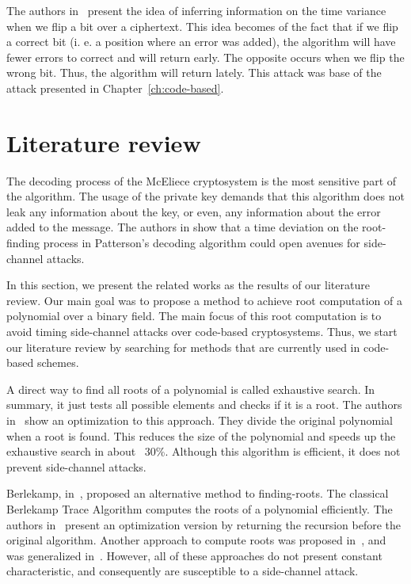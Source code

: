 The authors in~\cite{shoufan2009timing} present the idea of inferring information on the time variance when we flip a bit over a ciphertext. This idea becomes of the fact that if we flip a correct bit (i. e. a position where an error was added), the algorithm will have fewer errors to correct and will return early. The opposite occurs when we flip the wrong bit. Thus, the algorithm will return lately. This attack was base of the attack presented in Chapter~\ref{ch:code-based}.


\section{Literature review}
The decoding process of the McEliece cryptosystem is the most sensitive part of the algorithm. The usage of the private key demands that this algorithm does not leak any information about the key, or even, any information about the error added to the message. The authors in \cite{bucerzan2017improved} show that a time deviation on the root-finding process in Patterson's decoding algorithm could open avenues for side-channel attacks. 

In this section, we present the related works as the results of our literature review. Our main goal was to propose a method to achieve root computation of a polynomial over a binary field. The main focus of this root computation is to avoid timing side-channel attacks over code-based cryptosystems. Thus, we start our literature review by searching for methods that are currently used in code-based schemes.

A direct way to find all roots of a polynomial is called exhaustive search. In summary, it just tests all possible elements and checks if it is a root. The authors in~\cite{strenzke2012fast} show an optimization to this approach. They divide the original polynomial when a root is found. This reduces the size of the polynomial and speeds up the exhaustive search in about ~30\%. Although this algorithm is efficient, it does not prevent side-channel attacks.

Berlekamp, in~\cite{berlekamp1970factoring}, proposed an alternative method to finding-roots. The classical Berlekamp Trace Algorithm computes the roots of a polynomial efficiently. The authors in~\cite{strenzke2012fast} present an optimization version by returning the recursion before the original algorithm. Another approach to compute roots was proposed in~\cite{fedorenko2002finding}, and was generalized in~\cite{Skachek2008, biswas2009}. However, all of these approaches do not present constant characteristic, and consequently are susceptible to a side-channel attack.

